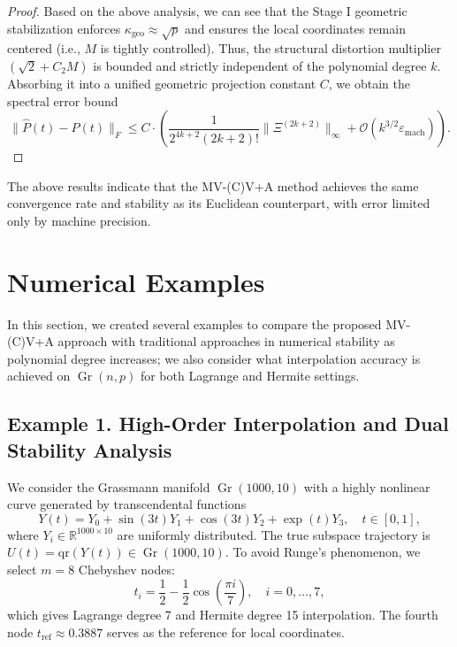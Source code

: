 \documentclass[11pt]{article}
\DeclareMathOperator{\Gr}{Gr}
\begin{document}
\begin{proof}
Based on the above analysis, we can see that the Stage I geometric stabilization enforces $\kappa_{\mathrm{geo}} \approx \sqrt{p}$ and ensures the local coordinates remain centered (i.e., $M$ is tightly controlled). Thus, the structural distortion multiplier $(\sqrt{2} + C_2 M)$ is bounded and strictly independent of the polynomial degree $k$. Absorbing it into a unified geometric projection constant $C$, we obtain the spectral error bound
 $$
\|\hat{P}(t) - P(t)\|_F \leq C \cdot \left( \frac{1}{2^{4k+2}(2k+2)!} \|\Xi^{(2k+2)}\|_\infty + \mathcal{O}(k^{3/2} \varepsilon_{\mathrm{mach}}) \right).$$
\end{proof}
The above results indicate that the MV-(C)V+A method achieves the same convergence rate and stability as its Euclidean counterpart, with error limited only by machine precision.





 
\section{Numerical Examples}
 \label{sec6}
In this section, we created several examples to compare the proposed MV-(C)V+A approach with traditional approaches in numerical stability as polynomial degree increases; we also consider what interpolation accuracy is achieved on $\Gr(n,p)$ for both Lagrange and Hermite settings.

\subsection*{Example 1. High-Order Interpolation and Dual Stability Analysis}

We consider the Grassmann manifold $\Gr(1000,10)$ with a highly nonlinear curve generated by transcendental functions
\begin{equation} \label{eq:transcendental_curve}
Y(t) = Y_0 + \sin(3t)Y_1 + \cos(3t)Y_2 + \exp(t)Y_3, \quad t \in [0,1],
\end{equation}
where $Y_i \in \mathbb{R}^{1000\times10}$ are uniformly distributed. The true subspace trajectory is $U(t) = \mathrm{qr}(Y(t)) \in \Gr(1000,10)$. To avoid Runge's phenomenon, we select $m=8$ Chebyshev nodes:
\begin{equation}
t_i = \frac{1}{2} - \frac{1}{2}\cos\left(\frac{\pi i}{7}\right), \quad i = 0,\ldots,7,
\end{equation}
which gives Lagrange degree 7 and Hermite degree 15 interpolation. The fourth node $t_{\text{ref}} \approx 0.3887$ serves as the reference for local coordinates.
\end{document}
